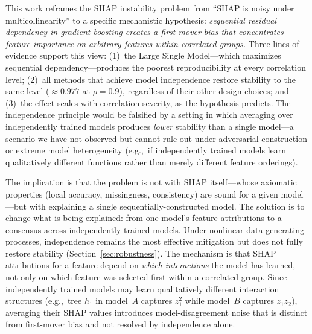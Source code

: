 \documentclass[10pt]{article}
\newcommand{\rhovar}{\rho}
\newcommand{\eg}{e.g.,\ }
\begin{document}
This work reframes the SHAP instability problem from ``SHAP is noisy
under multicollinearity'' to a specific mechanistic hypothesis:
\emph{sequential residual dependency in gradient boosting creates a
first-mover bias that concentrates feature importance on arbitrary
features within correlated groups.} Three lines of evidence support this view:
(1)~the Large Single Model---which maximizes sequential dependency---produces
the poorest reproducibility at every correlation level;
(2)~all methods that achieve model independence restore stability to the
same level ($\approx 0.977$ at $\rhovar = 0.9$), regardless of their other
design choices; and
(3)~the effect scales with correlation severity, as the hypothesis
predicts.
The independence principle would be falsified by a setting in which
averaging over independently trained models produces \emph{lower}
stability than a single model---a scenario we have not observed but
cannot rule out under adversarial construction or extreme model
heterogeneity (\eg if independently trained models learn qualitatively
different functions rather than merely different feature orderings).

The implication is that the problem is not with SHAP itself---whose
axiomatic properties (local accuracy, missingness, consistency) are
sound for a given model---but with explaining a single
sequentially-constructed model. The solution is to change what is
being explained: from one model's feature attributions to a consensus
across independently trained models. Under nonlinear data-generating
processes, independence remains the most effective mitigation but does
not fully restore stability (Section~\ref{sec:robustness}). The
mechanism is that SHAP attributions for a feature depend on \emph{which
interactions} the model has learned, not only on which feature was
selected first within a correlated group. Since independently trained
models may learn qualitatively different interaction structures
(\eg tree $h_1$ in model~$A$ captures $z_1^2$ while model~$B$ captures
$z_1 z_2$), averaging their SHAP values introduces model-disagreement
noise that is distinct from first-mover bias and not resolved by
independence alone.
\end{document}
